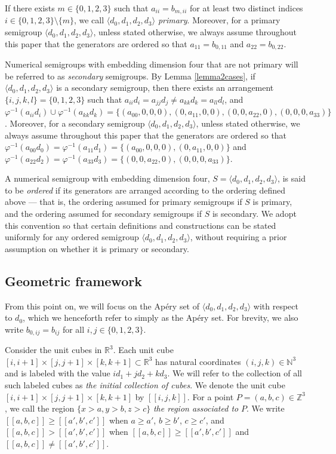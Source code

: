 \documentclass[12pt]{article}
\theoremstyle{remark}
\begin{document}
If there exists $m \in \{0,1,2,3\}$ such that $a_{ii} = b_{m,ii}$ for at least two distinct indices $i \in \{0,1,2,3\} \setminus \{m\}$, we call $\langle d_0,d_1,d_2,d_3 \rangle$ \emph{primary}. Moreover, for a primary semigroup $\langle d_0,d_1,d_2,d_3 \rangle$, unless stated otherwise, we always assume throughout this paper that the generators are ordered so that $a_{11} = b_{0,11}$ and $a_{22} = b_{0,22}$. 

Numerical semigroups with embedding dimension four that are not primary will be referred to as \emph{secondary} semigroups. By Lemma \ref{lemma2cases}, if $\langle d_0,d_1,d_2,d_3 \rangle$ is a secondary semigroup, then there exists an arrangement $\{i,j,k,l\} = \{0,1,2,3\}$ such that $a_{ii}d_i = a_{jj}d_j \neq a_{kk}d_k = a_{ll}d_l$, and $\varphi^{-1}(a_{ii}d_i) \cup \varphi^{-1}(a_{kk}d_k) =  \{(a_{00},0,0,0), (0,a_{11},0,0), (0,0,a_{22},0),(0,0,0,a_{33})\}$. Moreover, for a secondary semigroup $\langle d_0,d_1,d_2,d_3 \rangle$, unless stated otherwise, we always assume throughout this paper that the generators are ordered so that $\varphi^{-1}(a_{00}d_0) = \varphi^{-1}(a_{11}d_1)= \{(a_{00},0,0,0), (0,a_{11},0,0)\}$ and $ \varphi^{-1}(a_{22}d_2) = \varphi^{-1}(a_{33}d_3) =  \{(0,0,a_{22},0), (0,0,0,a_{33})\}$. 

A numerical semigroup with embedding dimension four, $S=\langle d_0,d_1,d_2,d_3 \rangle$, is said to be \emph{ordered} if its generators are arranged according to the ordering defined above --- that is, the ordering assumed for primary semigroups if $S$ is primary, and the ordering assumed for secondary semigroups if $S$ is secondary. We adopt this convention so that certain definitions and constructions can be stated uniformly for any ordered semigroup $\langle d_0,d_1,d_2,d_3 \rangle$, without requiring a prior assumption on whether it is primary or secondary.

\subsection{Geometric framework}\label{subsection_framework}

From this point on, we will focus on the Ap{\'e}ry set of $\langle d_0,d_1,d_2,d_3 \rangle$ with respect to $d_0$, which we henceforth refer to simply as the Ap{\'e}ry set. For brevity, we also write $b_{0,ij} = b_{ij}$ for all $i,j \in \{0,1,2,3\}$. 


Consider the unit cubes in $\mathbb{R}^3$. Each unit cube $[i,i+1] \times [j,j+1] \times [k,k+1] \subset \mathbb{R}^3$ has natural coordinates $(i,j,k) \in \mathbb{N}^3$ and is labeled with the value $id_1 + jd_2 + kd_3$. We will refer to the collection of all such labeled cubes as \emph{the initial collection of cubes}. We denote the unit cube $[i,i+1] \times [j,j+1] \times [k,k+1]$ by $[[i,j,k]]$.
For a point $P =(a,b,c) \in \mathbb{Z}^3$, we call the region $\{x > a, y>b, z>c\}$ \emph{the region associated to} $P$. We write $[[a,b,c]] \geq [[a',b',c']]$ when $a \geq a'$, $b \geq b'$, $c \geq c'$, and $[[a,b,c]] > [[a',b',c']]$ when $[[a,b,c]] \geq [[a',b',c']]$ and $[[a,b,c]] \neq [[a',b',c']]$.
\end{document}
